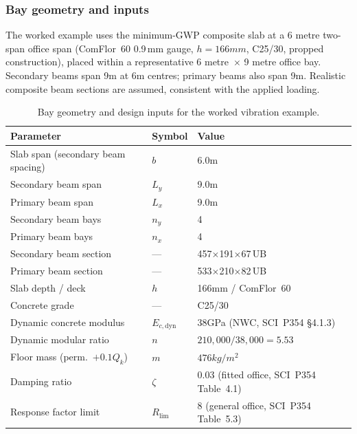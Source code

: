 \subsubsection*{Bay geometry and inputs}

The worked example uses the minimum-GWP composite slab at a 6 metre two-span office span (ComFlor~60 0.9\,mm gauge, $h = 166 mm$, C25/30, propped construction), placed within a representative 6 metre~$\times$ 9 metre office bay. Secondary beams span 9m at 6m centres; primary beams also span 9m. Realistic composite beam sections are assumed, consistent with the applied loading.

\begin{table}[h!]
\small
\centering
\caption{Bay geometry and design inputs for the worked vibration example.}
\label{tab:vib_example_inputs}
\begin{tabular}{lll}
\toprule
Parameter & Symbol & Value \\
\midrule
Slab span (secondary beam spacing) & $b$     & 6.0m \\
Secondary beam span                & $L_y$   & 9.0m \\
Primary beam span                  & $L_x$   & 9.0m \\
Secondary beam bays                & $n_y$   & 4 \\
Primary beam bays                  & $n_x$   & 4 \\
Secondary beam section             & ---     & 457$\times$191$\times$67\,UB \\
Primary beam section               & ---     & 533$\times$210$\times$82\,UB \\
Slab depth / deck                  & $h$     & 166mm / ComFlor~60 \\
Concrete grade                     & ---     & C25/30 \\
Dynamic concrete modulus           & $E_{c,\mathrm{dyn}}$ & 38GPa (NWC, SCI~P354 \S4.1.3) \\
Dynamic modular ratio              & $n$     & $210{,}000/38{,}000 = 5.53$ \\
Floor mass (perm.\ $+ 0.1Q_k$)    & $m$     & $476kg/m^2$ \\
Damping ratio                      & $\zeta$ & 0.03 (fitted office, SCI~P354 Table~4.1) \\
Response factor limit              & $R_\mathrm{lim}$ & 8 (general office, SCI~P354 Table~5.3) \\
\bottomrule
\end{tabular}
\end{table}

